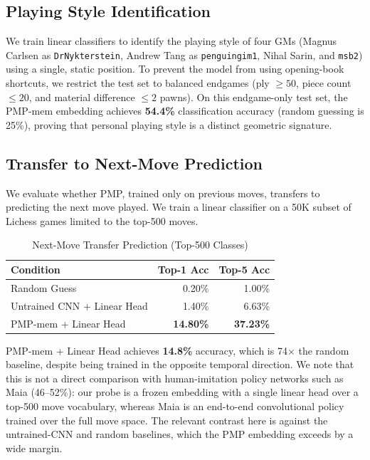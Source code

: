 \documentclass[journal]{IEEEtran}
\begin{document}
\subsection{Playing Style Identification}
We train linear classifiers to identify the playing style of four GMs (Magnus Carlsen as \texttt{DrNykterstein}, Andrew Tang as \texttt{penguingim1}, Nihal Sarin, and \texttt{msb2}) using a single, static position. To prevent the model from using opening-book shortcuts, we restrict the test set to balanced endgames (ply $\ge 50$, piece count $\le 20$, and material difference $\le 2$ pawns). On this endgame-only test set, the PMP-mem embedding achieves \textbf{54.4\%} classification accuracy (random guessing is 25\%), proving that personal playing style is a distinct geometric signature.

\subsection{Transfer to Next-Move Prediction}
We evaluate whether PMP, trained only on previous moves, transfers to predicting the next move played. We train a linear classifier on a 50K subset of Lichess games limited to the top-500 moves.

\begin{table}[h]
\caption{Next-Move Transfer Prediction (Top-500 Classes)}
\label{tab:transfer}
\centering
\begin{tabular}{lrr}
\toprule
Condition & Top-1 Acc & Top-5 Acc \\
\midrule
Random Guess & 0.20\% & 1.00\% \\
Untrained CNN + Linear Head & 1.40\% & 6.63\% \\
PMP-mem + Linear Head & \textbf{14.80\%} & \textbf{37.23\%} \\
\bottomrule
\end{tabular}
\end{table}

PMP-mem + Linear Head achieves \textbf{14.8\%} accuracy, which is 74$\times$ the random baseline, despite being trained in the opposite temporal direction. We note that this is not a direct comparison with human-imitation policy networks such as Maia (46--52\%): our probe is a frozen embedding with a single linear head over a top-500 move vocabulary, whereas Maia is an end-to-end convolutional policy trained over the full move space. The relevant contrast here is against the untrained-CNN and random baselines, which the PMP embedding exceeds by a wide margin.
\end{document}
